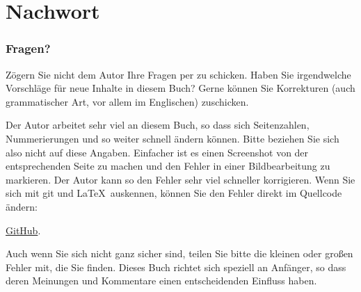 \part*{Nachwort}

\section{Fragen?}

Zögern Sie nicht dem Autor Ihre Fragen per \GTT{<\EMAIL>} zu schicken.
Haben Sie irgendwelche Vorschläge für neue Inhalte in diesem Buch?
Gerne können Sie Korrekturen (auch grammatischer Art, vor allem im Englischen) zuschicken.

Der Autor arbeitet sehr viel an diesem Buch, so dass sich Seitenzahlen, Nummerierungen und so weiter
schnell ändern können. Bitte beziehen Sie sich also nicht auf diese Angaben.
Einfacher ist es einen Screenshot von der entsprechenden Seite zu machen und den Fehler in einer Bildbearbeitung
zu markieren. Der Autor kann so den Fehler sehr viel schneller korrigieren.
Wenn Sie sich mit git und \LaTeX\ auskennen, können Sie den Fehler direkt im Quellcode ändern:

\href{http://go.yurichev.com/17089}{GitHub}.

Auch wenn Sie sich nicht ganz sicher sind, teilen Sie bitte die kleinen oder großen Fehler mit, die Sie finden.
Dieses Buch richtet sich speziell an Anfänger, so dass deren Meinungen und Kommentare einen entscheidenden Einfluss haben.
